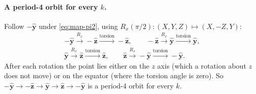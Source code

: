 \documentclass[11pt,a4paper]{article}
\begin{document}
\paragraph{A period-4 orbit for every $k$.} Follow $-\hat{\bm y}$ under \eqref{eq:map-pi2}, using $R_x(\pi/2):
(X,Y,Z)\mapsto(X,-Z,Y)$:
\begin{gather*}
  -\hat{\bm y} \xrightarrow{R_x} -\hat{\bm z} \xrightarrow{\text{torsion}} -\hat{\bm z}, \qquad
  -\hat{\bm z} \xrightarrow{R_x} \hat{\bm y} \xrightarrow{\text{torsion}} \hat{\bm y}, \\
  \hat{\bm y} \xrightarrow{R_x} \hat{\bm z} \xrightarrow{\text{torsion}} \hat{\bm z}, \qquad
  \hat{\bm z} \xrightarrow{R_x} -\hat{\bm y} \xrightarrow{\text{torsion}} -\hat{\bm y}.
\end{gather*}
After each rotation the point lies either on the $z$ axis (which a rotation about $z$ does not move) or on the
equator (where the torsion angle is zero). So $-\hat{\bm y} \to -\hat{\bm z} \to \hat{\bm y} \to \hat{\bm z} \to
-\hat{\bm y}$ is a period-4 orbit for every $k$.
\end{document}

